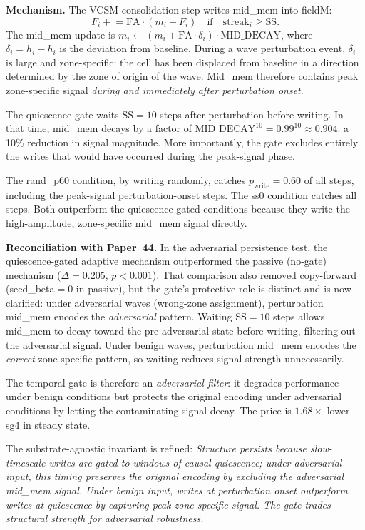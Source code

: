 \documentclass[11pt,a4paper]{article}
\begin{document}
\textbf{Mechanism.}
The VCSM consolidation step writes mid\_mem into fieldM:
\begin{equation}
  F_i \mathrel{+}= \mathrm{FA}\cdot(m_i - F_i)
  \quad\text{if}\quad \mathrm{streak}_i \geq \mathrm{SS}.
\end{equation}
The mid\_mem update is $m_i \leftarrow (m_i + \mathrm{FA}\cdot\delta_i)\cdot\mathrm{MID\_DECAY}$,
where $\delta_i = h_i - \bar{h}_i$ is the deviation from baseline.
During a wave perturbation event, $\delta_i$ is large and zone-specific:
the cell has been displaced from baseline in a direction determined by
the zone of origin of the wave.
Mid\_mem therefore contains peak zone-specific signal \emph{during and immediately
after perturbation onset}.

The quiescence gate waits $\mathrm{SS}=10$ steps after perturbation before writing.
In that time, mid\_mem decays by a factor of $\mathrm{MID\_DECAY}^{10} = 0.99^{10} \approx 0.904$:
a 10\% reduction in signal magnitude.
More importantly, the gate excludes entirely the writes that would have occurred
during the peak-signal phase.

The rand\_p60 condition, by writing randomly, catches $p_{\mathrm{write}}=0.60$
of all steps, including the peak-signal perturbation-onset steps.
The ss0 condition catches all steps.
Both outperform the quiescence-gated conditions because they
write the high-amplitude, zone-specific mid\_mem signal directly.

\textbf{Reconciliation with Paper~44.}
In the adversarial persistence test, the quiescence-gated adaptive mechanism
outperformed the passive (no-gate) mechanism ($\Delta=0.205$, $p<0.001$).
That comparison also removed copy-forward (seed\_beta$=0$ in passive),
but the gate's protective role is distinct and is now clarified:
under adversarial waves (wrong-zone assignment), perturbation mid\_mem
encodes the \emph{adversarial} pattern.
Waiting $\mathrm{SS}=10$ steps allows mid\_mem to decay toward the pre-adversarial
state before writing, filtering out the adversarial signal.
Under benign waves, perturbation mid\_mem encodes the \emph{correct} zone-specific
pattern, so waiting reduces signal strength unnecessarily.

The temporal gate is therefore an \emph{adversarial filter}:
it degrades performance under benign conditions but protects the original
encoding under adversarial conditions by letting the contaminating signal decay.
The price is $1.68\times$ lower sg4 in steady state.

The substrate-agnostic invariant is refined:
\emph{Structure persists because slow-timescale writes are gated to windows
of causal quiescence; under adversarial input, this timing preserves the
original encoding by excluding the adversarial mid\_mem signal.
Under benign input, writes at perturbation onset outperform writes at quiescence
by capturing peak zone-specific signal.
The gate trades structural strength for adversarial robustness.}
\end{document}
